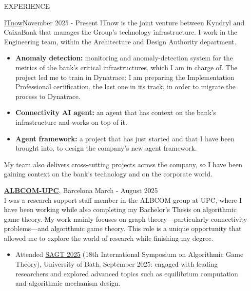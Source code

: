 \documentclass{resume} %
\begin{document}
\begin{rSection}{EXPERIENCE}
  \begin{rSubsection}{\href{https://www.itnow.es/}{ITnow}}{November 2025
    - Present}{}{}
    ITnow is the joint venture between Kyndryl and CaixaBank that manages
    the Group's technology infrastructure. I work in the Engineering
    team, within the Architecture and Design Authority department.
    \begin{itemize}
      \item \textbf{Anomaly detection:} monitoring and anomaly-detection
        system for the metrics of the bank's critical infrastructures,
        which I am in charge of. The project led me to train in Dynatrace: I am
        preparing the Implementation Professional certification, the last
        one in its track, in order to migrate the process to Dynatrace.
      \item \textbf{Connectivity AI agent:} an agent that has context on
        the bank's infrastructure and works on top of it.
      \item \textbf{Agent framework:} a project that has just started and
        that I have been brought into, to design the company's new agent
        framework.
    \end{itemize}
    My team also delivers cross-cutting projects across the company, so I
    have been gaining context on the bank's technology and on the
    corporate world.
  \end{rSubsection}

  \textbf{\href{https://albcom.cs.upc.edu/}{ALBCOM-UPC}}, Barcelona
  \hfill {March - August 2025} \\
  I was a research support staff member in the ALBCOM group at UPC, where
  I have been working while also completing my Bachelor's Thesis on
  algorithmic game theory. My work mainly focuses on graph
  theory---particularly connectivity problems---and algorithmic game
  theory. This role is a unique opportunity that allowed me to explore
  the world of research while finishing my degree.
  \begin{itemize}
    \item Attended
      \href{https://www.bath.ac.uk/corporate-information/the-international-symposium-on-algorithmic-game-theory-sagt-2025-program}{SAGT
      2025} (18th International Symposium on Algorithmic Game Theory),
      University of Bath, September 2025: engaged with leading researchers
      and explored advanced topics such as equilibrium computation and
      algorithmic mechanism design.
  \end{itemize}


\end{rSection}
\end{document}
